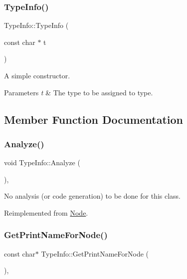 \subsubsection{\texorpdfstring{Type\+Info()}{TypeInfo()}}
{\footnotesize\ttfamily Type\+Info\+::\+Type\+Info (\begin{DoxyParamCaption}\item[{const char $\ast$}]{t }\end{DoxyParamCaption})}

A simple constructor. 
\begin{DoxyParams}{Parameters}
{\em t} & The type to be assigned to type. \\
\hline
\end{DoxyParams}


\subsection{Member Function Documentation}
\mbox{\label{class_type_info_a157de3b92f5333b031650065591ac04f}} 
\subsubsection{\texorpdfstring{Analyze()}{Analyze()}}
{\footnotesize\ttfamily void Type\+Info\+::\+Analyze (\begin{DoxyParamCaption}{ }\end{DoxyParamCaption})\hspace{0.3cm}{\ttfamily [inline]}, {\ttfamily [virtual]}}

No analysis (or code generation) to be done for this class. 

Reimplemented from \hyperlink{class_node_a5f88d55c6f253a29def7ccc443d83d47}{Node}.

\mbox{\label{class_type_info_a3e84b02093115e1ad0c27acbe3ffffd7}} 
\subsubsection{\texorpdfstring{Get\+Print\+Name\+For\+Node()}{GetPrintNameForNode()}}
{\footnotesize\ttfamily const char$\ast$ Type\+Info\+::\+Get\+Print\+Name\+For\+Node (\begin{DoxyParamCaption}{ }\end{DoxyParamCaption})\hspace{0.3cm}{\ttfamily [inline]}, {\ttfamily [virtual]}}


